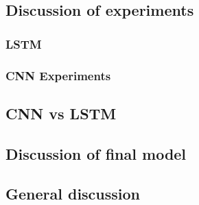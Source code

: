 \subsection{Discussion of experiments}
\subsubsection{LSTM}

\subsubsection{CNN Experiments}


\subsection{CNN vs LSTM}


\subsection{Discussion of final model}
\subsection{General discussion}
